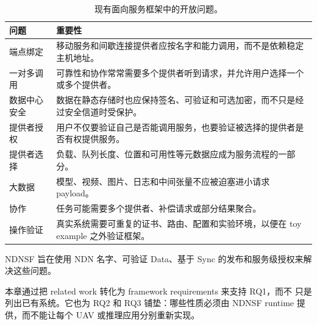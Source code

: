 \begin{table}[H]
\centering
\caption{现有面向服务框架中的开放问题。}
\label{tab:framework-gaps-ch}
\begin{tabularx}{\textwidth}{p{}X}
\toprule
问题 & 重要性 \\
\midrule
端点绑定 & 移动服务和间歇连接提供者应按名字和能力调用，而不是依赖稳定主机地址。 \\
一对多调用 & 可靠性和协作常常需要多个提供者听到请求，并允许用户选择一个或多个提供者。 \\
数据中心安全 & 数据在静态存储时也应保持签名、可验证和可选加密，而不只是经过安全信道时受保护。 \\
提供者授权 & 用户不仅要验证自己是否能调用服务，也要验证被选择的提供者是否有权提供服务。 \\
提供者选择 & 负载、队列长度、位置和可用性等元数据应成为服务流程的一部分。 \\
大数据 & 模型、视频、图片、日志和中间张量不应被迫塞进小请求 payload。 \\
协作 & 任务可能需要多个提供者、补偿请求或部分结果聚合。 \\
操作验证 & 真实系统需要可重复的证书、路由、配置和实验环境，以便在 toy
example 之外验证框架。 \\
\bottomrule
\end{tabularx}
\end{table}

NDNSF 旨在使用 NDN 名字、可验证 Data、基于 Sync 的发布和服务级授权来解
决这些问题。

本章通过把 related work 转化为 framework requirements 来支持 RQ1，而不
只是列出已有系统。它也为 RQ2 和 RQ3 铺垫：哪些性质必须由 NDNSF runtime
提供，而不能让每个 UAV 或推理应用分别重新实现。
